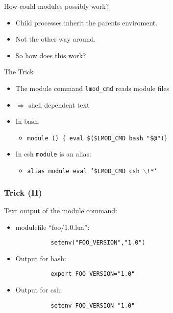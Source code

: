 \documentclass{beamer}
\begin{document}
\begin{frame}{How could modules possibly work?}
  \begin{itemize}
    \item Child processes inherit the parents enviroment.
    \item Not the other way around.
    \item So how does this work?
  \end{itemize}
\end{frame}

\begin{frame}{The Trick}
  \begin{itemize}
    \item The module command \texttt{lmod\_cmd} reads module files
    \item $\Rightarrow$ shell dependent text
    \item In bash:
      \begin{itemize}
          \item \texttt{module () \{ eval \$(\$LMOD\_CMD bash "\$@")\}}
      \end{itemize}
    \item In csh \texttt{module} is an alias:
      \begin{itemize}
        \item \texttt{alias module eval `\$LMOD\_CMD csh $\backslash$!*`}
      \end{itemize}
  \end{itemize}
\end{frame}

\begin{frame}[fragile]
    \frametitle{Trick (II)}
    Text output of the module command:
    \begin{itemize}
      \item modulefile ``foo/1.0.lua'':
    {
\begin{verbatim}
          setenv("FOO_VERSION","1.0")
\end{verbatim}
    }
     \item Output for bash:
\begin{verbatim}
          export FOO_VERSION="1.0"
\end{verbatim}
     \item Output for csh:
\begin{verbatim}
          setenv FOO_VERSION "1.0"
\end{verbatim}
    \end{itemize}
\end{frame}
\end{document}
